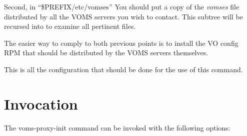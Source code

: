 \documentclass[a4paper]{book}
\begin{document}
Second, in ``\$PREFIX/etc/vomses'' You should put a copy of the
\emph{vomses} file distributed by all the VOMS servers you wish to
contact.  This subtree will be recursed into to examine all pertinent
files.

The easier way to comply to both previous points is to install the VO
config RPM that should be distributed by the VOMS servers themselves.

This is all the configuration that should be done for the use of this
command.

\section{Invocation}

The voms-proxy-init command can be invoked with the following
options: 
\end{document}
